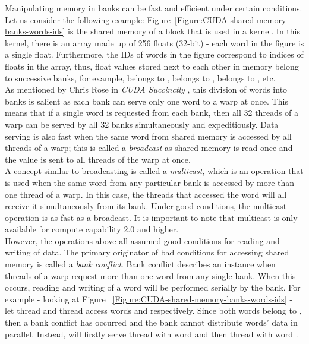 Manipulating memory in banks can be fast and efficient under certain conditions. Let us consider the following example: Figure~\ref{Figure:CUDA-shared-memory-banks-words-ids} is the shared memory of a block that is used in a kernel. In this kernel, there is an array made up of 256 floats (32-bit) - each word in the figure is a single float. Furthermore, the IDs of words in the figure correspond to indices of floats in the array, thus, float values stored next to each other in memory belong to successive banks, for example,  belongs to ,  belongs to ,  belongs to , etc. \\
As mentioned by Chris Rose in \emph{CUDA Succinctly} \cite{Rose2017}, this division of words into banks is salient as each bank can serve only one word to a warp at once. This means that if a single word is requested from each bank, then all 32 threads of a warp can be served by all 32 banks simultaneously and expeditiously. Data serving is also fast when the same word from shared memory is accessed by all threads of a warp; this is called a \textit{broadcast} as shared memory is read once and the value is sent to all threads of the warp at once. \\
A concept similar to broadcasting is called a \textit{multicast}, which is an operation that is used when the same word from any particular bank is accessed by more than one thread of a warp. In this case, the threads that accessed the word will all receive it simultaneously from its bank. Under good conditions, the multicast operation is as fast as a broadcast. It is important to note that multicast is only available for compute capability 2.0 and higher. \\
However, the operations above all assumed good conditions for reading and writing of data. The primary originator of bad conditions for accessing shared memory is called a \textit{bank conflict}. Bank conflict describes an instance when threads of a warp request more than one word from any single bank. When this occurs, reading and writing of a word will be performed serially by the bank. For example - looking at Figure ~\ref{Figure:CUDA-shared-memory-banks-words-ids} - let thread  and thread  access words  and  respectively. Since both words belong to , then a bank conflict has occurred and the bank cannot distribute words' data in parallel. Instead,  will firstly serve thread  with word  and then thread  with word . \\
